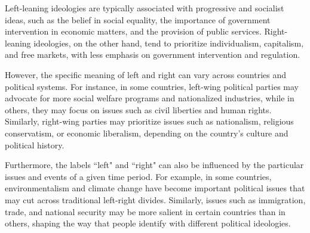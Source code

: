 Left-leaning ideologies are typically associated with progressive and socialist ideas, such as the belief in social equality, the importance of government intervention in economic matters, and the provision of public services.
Right-leaning ideologies, on the other hand, tend to prioritize individualism, capitalism, and free markets, with less emphasis on government intervention and regulation.

However, the specific meaning of left and right can vary across countries and political systems.
For instance, in some countries, left-wing political parties may advocate for more social welfare programs and nationalized industries, while in others, they may focus on issues such as civil liberties and human rights.
Similarly, right-wing parties may prioritize issues such as nationalism, religious conservatism, or economic liberalism, depending on the country's culture and political history.

Furthermore, the labels ``left" and ``right" can also be influenced by the particular issues and events of a given time period.
For example, in some countries, environmentalism and climate change have become important political issues that may cut across traditional left-right divides.
Similarly, issues such as immigration, trade, and national security may be more salient in certain countries than in others, shaping the way that people identify with different political ideologies.







\begin{table}[ht]
    \centering
    \caption{Example of Left and Right positions according to AllSides}
    \label{tab:allsides_leaning_positions}
\end{table}

